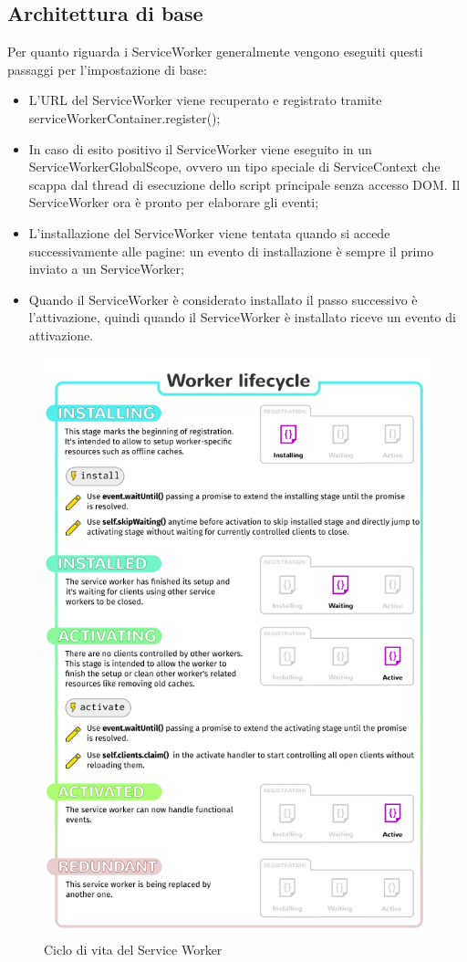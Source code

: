 \documentclass[11pt ,a4paper , twoside , openright ]{article}
\begin{document}
\subsection{Architettura di base}
Per quanto riguarda i ServiceWorker generalmente vengono eseguiti questi passaggi per l'impostazione di base:
\begin{itemize}
	\item L'URL del ServiceWorker viene recuperato e registrato tramite serviceWorkerContainer.register();
	\item In caso di esito positivo il ServiceWorker viene eseguito in un ServiceWorkerGlobalScope, ovvero un tipo speciale di ServiceContext che scappa dal thread di esecuzione dello script principale senza accesso DOM. Il ServiceWorker ora è pronto per elaborare gli eventi;
	\item L'installazione del ServiceWorker viene tentata quando si accede successivamente alle pagine: un evento di installazione è sempre il primo inviato a un ServiceWorker;
	\item Quando il ServiceWorker è considerato installato il passo successivo è l'attivazione, quindi quando il ServiceWorker è installato riceve un evento di attivazione.
\end{itemize}
\begin{figure}[h]
	\centering
	\includegraphics[width=0.6\linewidth]{SwLifecycle}
	\caption{Ciclo di vita del Service Worker}
	\label{fig:Ciclo di vita del Service Worker}
\end{figure}
\end{document}
